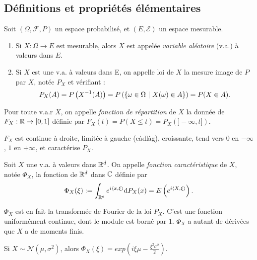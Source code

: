 \documentclass[11pt,a4paper]{article}
\begin{document}
\subsection*{Définitions et propriétés élémentaires}

\begin{definstar} Soit  $(\Omega, \mathcal{F}, P)$ un espace probabilisé, et $(E,\mathcal{E})$ un espace mesurable.
\begin{enumerate}
\item Si $X: \Omega \to E$ est mesurable, alors $X$ est appelée \textit{variable aléatoire} (v.a.) à valeurs dans $E$.
\item Si $X$ est une v.a. à valeurs dans E, on appelle loi de $X$ la mesure image de $P$ par $X$, notée $P_X$ et vérifiant : 
\[P_X(A) = P\left(X^{-1}(A)\right)=P\left(\left\{ \omega\in \Omega \ \middle| \  X(\omega)\in A \right\}\right) =P(X\in A).\]
\end{enumerate}
\end{definstar}

\begin{definstar}
Pour toute v.a.r $X$, on appelle \textit{fonction de répartition} de $X$ la donnée de $F_X :\mathbb R \to [0,1]$ définie par $F_X(t) = P(X\leq t) = P_X(]-\infty,t])$.
\end{definstar}

\begin{rmq}
$F_X$ est continue à droite, limitée à gauche (càdlàg), croissante, tend vers $0$ en $-\infty$, $1$ en $+\infty$, et caractérise $P_X$.
\end{rmq}

\begin{definstar}
Soit $X$ une v.a. à valeurs dans $\mathbb R^d$. On appelle \textit{fonction caractéristique} de $X$, notée $\Phi_X$, la fonction de $\mathbb R^d$ dans $\mathbb C$ définie par \[\Phi_X(\xi) := \int_{\mathbb R^d} e^{i\left<x,\xi\right>}\mathrm{d}P_X(x) = E\left(e^{i\left<X,\xi\right>}\right).\]
\end{definstar}

\begin{rmq}
$\Phi_X$ est en fait la transformée de Fourier de la loi $P_X$. C'est une fonction uniformément continue, dont le module est borné par $1$. $\Phi_X$ a autant de dérivées que $X$ a de moments finis.
\end{rmq}

\begin{rmq}
Si $X\sim \mathcal{N}(\mu,\sigma^2)$, alors $\Phi_X(\xi)=exp(i\xi\mu - \frac{\xi^2\sigma^2}{2})$.
\end{rmq}
\end{document}
